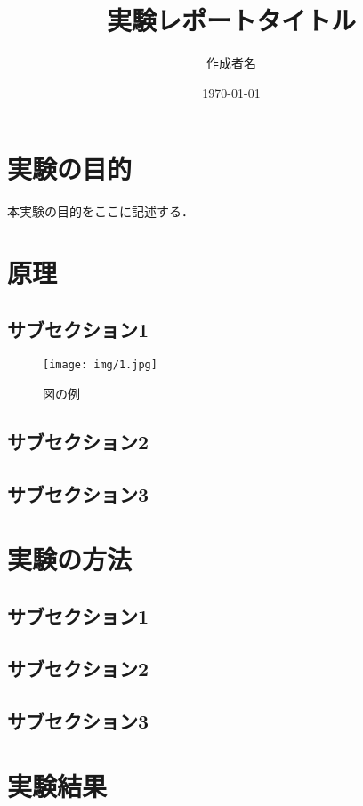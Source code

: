 \documentclass[lualatex,ja=standard]{bxjsarticle}
\title{実験レポートタイトル}
\author{作成者名}
\date{\today}
\begin{document}


\setcounter{page}{1}

\section{実験の目的}
本実験の目的をここに記述する．

\section{原理}
\subsection{サブセクション1}

\begin{figure}[H]
  \centering
  \texttt{[image: img/1.jpg]}
  \caption{図の例}
  \label{fig:1}
\end{figure}

\subsection{サブセクション2}


\subsection{サブセクション3}


\section{実験の方法}
\subsection{サブセクション1}


\subsection{サブセクション2}


\subsection{サブセクション3}


\section{実験結果}
\end{document}
